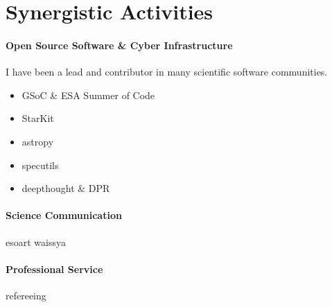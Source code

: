 \documentclass[10pt]{article}
\begin{document}
\section*{Synergistic Activities}
\paragraph{Open Source Software \& Cyber Infrastructure} I have been a lead and contributor in many scientific software communities. 
\begin{itemize}
    \item GSoC \& ESA Summer of Code
    \item StarKit
    \item astropy
    \item specutils
    \item deepthought \& DPR
\end{itemize}
\paragraph{Science Communication}
esoart
waissya

\paragraph{Professional Service}
refereeing
\end{document}
